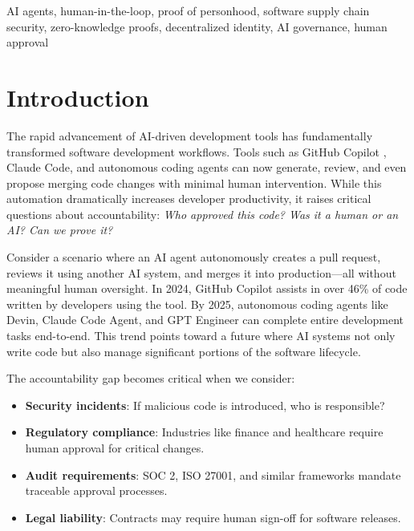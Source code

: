 \documentclass[conference]{IEEEtran}
\begin{document}
\begin{IEEEkeywords}
AI agents, human-in-the-loop, proof of personhood, software supply chain security, zero-knowledge proofs, decentralized identity, AI governance, human approval
\end{IEEEkeywords}

\section{Introduction}

The rapid advancement of AI-driven development tools has fundamentally transformed software development workflows. Tools such as GitHub Copilot \cite{copilot}, Claude Code, and autonomous coding agents can now generate, review, and even propose merging code changes with minimal human intervention. While this automation dramatically increases developer productivity, it raises critical questions about accountability: \textit{Who approved this code? Was it a human or an AI? Can we prove it?}

Consider a scenario where an AI agent autonomously creates a pull request, reviews it using another AI system, and merges it into production—all without meaningful human oversight. In 2024, GitHub Copilot assists in over 46\% of code written by developers using the tool. By 2025, autonomous coding agents like Devin, Claude Code Agent, and GPT Engineer can complete entire development tasks end-to-end. This trend points toward a future where AI systems not only write code but also manage significant portions of the software lifecycle.

The accountability gap becomes critical when we consider:
\begin{itemize}
    \item \textbf{Security incidents}: If malicious code is introduced, who is responsible?
    \item \textbf{Regulatory compliance}: Industries like finance and healthcare require human approval for critical changes.
    \item \textbf{Audit requirements}: SOC 2, ISO 27001, and similar frameworks mandate traceable approval processes.
    \item \textbf{Legal liability}: Contracts may require human sign-off for software releases.
\end{itemize}
\end{document}
